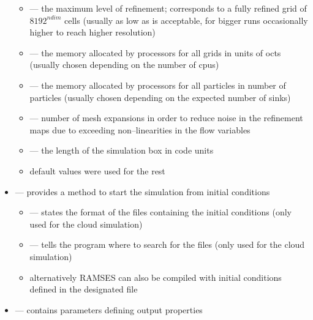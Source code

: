 \begin{itemize}
\begin{itemize}
    \item {} --- the maximum level of refinement; corresponds to a fully refined grid of $8192^{ndim}$ cells (usually as low as is acceptable, for bigger runs occasionally higher to reach higher resolution) \\[-9pt]
    \item {} --- the memory allocated by processors for all grids in units of octs (usually chosen depending on the number of cpus) \\[-9pt]
    \item {} --- the memory allocated by processors for all particles in number of particles (usually chosen depending on the expected number of sinks) \\[-9pt]
    \item {} --- number of mesh expansions in order to reduce noise in the refinement maps due to exceeding non--linearities in the flow variables \\[-9pt]
    \item {} --- the length of the simulation box in code units \\[-9pt]
    \item default values were used for the rest \\[-3pt]
  \end{itemize}
  \item {} \quad--- provides a method to start the simulation from initial conditions \\[-9pt]
  \begin{itemize}
    \item {} --- states the format of the files containing the initial conditions (only used for the cloud simulation) \\[-9pt]
    \item {} --- tells the program where to search for the files (only used for the cloud simulation) \\[-9pt]
    \item alternatively RAMSES can also be compiled with initial conditions defined in the designated file  \\[-3pt]
  \end{itemize}
  \item {} \quad--- contains parameters defining output properties\\[-9pt]
  \begin{itemize}

\end{itemize}
\end{itemize}
